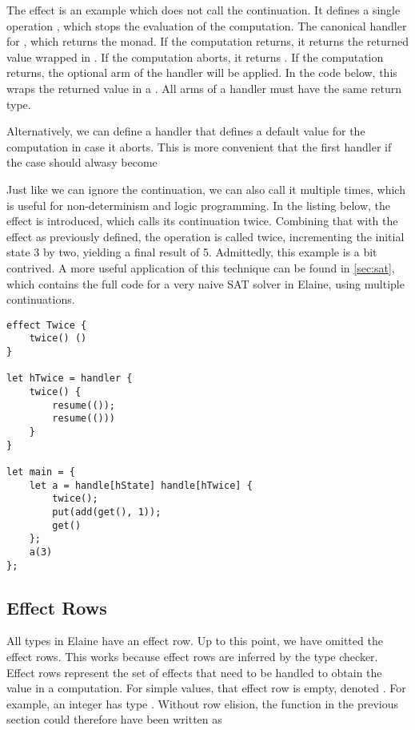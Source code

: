The  effect is an example which does not call the continuation. It defines a single operation , which stops the evaluation of the computation. The canonical handler for , which returns the  monad. If the computation returns, it returns the returned value wrapped in . If the computation aborts, it returns . If the computation returns, the optional  arm of the handler will be applied. In the code below, this wraps the returned value in a . All arms of a handler must have the same return type.


Alternatively, we can define a handler that defines a default value for the computation in case it aborts. This is more convenient that the first handler if the  case should alwasy become


Just like we can ignore the continuation, we can also call it multiple times, which is useful for non-determinism and logic programming. In the listing below, the  effect is introduced, which calls its continuation twice. Combining that with the  effect as previously defined, the  operation is called twice, incrementing the initial state 3 by two, yielding a final result of 5. Admittedly, this example is a bit contrived. A more useful application of this technique can be found in \cref{sec:sat}, which contains the full code for a very naive SAT solver in Elaine, using multiple continuations.

\begin{lstlisting}[language=elaine,style=fancy]
effect Twice {
    twice() ()
}

let hTwice = handler {
    twice() {
        resume(());
        resume(()))
    }
}

let main = {
    let a = handle[hState] handle[hTwice] {
        twice();
        put(add(get(), 1));
        get()
    };
    a(3)
};
\end{lstlisting}

\subsection{Effect Rows}

All types in Elaine have an effect row. Up to this point, we have omitted the effect rows. This works because effect rows are inferred by the type checker. Effect rows represent the set of effects that need to be handled to obtain the value in a computation. For simple values, that effect row is empty, denoted \el{<>}. For example, an integer has type . Without row elision, the  function in the previous section could therefore have been written as

